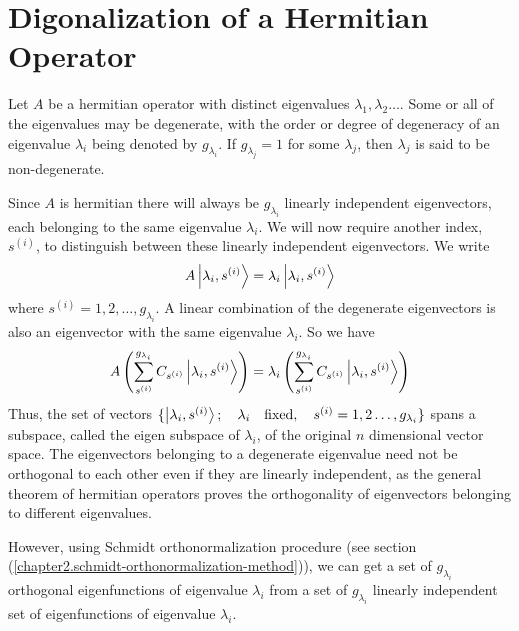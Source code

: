 	
	
	\section{Digonalization of a Hermitian Operator}
	Let $A$ be a hermitian operator with distinct eigenvalues $\lambda_1,\lambda_2\ldots$. Some or all of the eigenvalues may be degenerate, with the order or degree of degeneracy of an eigenvalue $\lambda_i$ being denoted by $g_{\lambda_i}$. If $g_{\lambda_j}=1$ for some $\lambda_j$, then $\lambda_j$ is said to be non-degenerate.
	
	
	Since $A$ is hermitian there will always be $g_{\lambda_i}$ linearly independent eigenvectors, each belonging to the same eigenvalue $\lambda_i$. We will now require another index, $s^{(i)}$, to distinguish between these linearly independent eigenvectors. We write
	\begin{equation}
		A \ket{\lambda_i, s^{(i)}} = \lambda_i \ket{\lambda_i, s^{(i)}}
		\label{chapter5.eqn9-eigenvectors-with-two-index}
	\end{equation}
	where $s^{(i)} = 1, 2, \ldots, g_{\lambda_i}$. A linear combination of the degenerate eigenvectors is also an eigenvector with the same eigenvalue $\lambda_i$. So we have
	\begin{equation}
		A \left(\sum_{s^{(i)}}^{g_{\lambda_i}}  C_{s^{(i)}} \ket{\lambda_i, s^{(i)}}\right) = \lambda_i \left(\sum_{s^{(i)}}^{g_{\lambda_i}}  C_{s^{(i)}} \ket{\lambda_i, s^{(i)}}\right)
		\label{chapter5.eqn10-combination-degenerate-eigenvectors}
	\end{equation}
	Thus, the set of vectors $\{ \ket{\lambda_i, s^{(i)}}; \quad \lambda_i \quad \text{fixed}, \quad s^{(i)}=1,2\ldots,g_{\lambda_i} \}$ spans a subspace, called the eigen subspace of $\lambda_i$, of the original $n$ dimensional vector space. The eigenvectors belonging to a degenerate eigenvalue need not be orthogonal to each other even if they are linearly independent, as the general theorem of hermitian operators proves the orthogonality of eigenvectors belonging to different eigenvalues.
	
	
	
	However, using Schmidt orthonormalization procedure (see section (\ref{chapter2.schmidt-orthonormalization-method})), we can get a set of $g_{\lambda_i}$ orthogonal 
	eigenfunctions %
	  of eigenvalue $\lambda_i$ from a set of $g_{\lambda_i}$ linearly independent set of
	  eigenfunctions
	   of eigenvalue $\lambda_i$.
	   
